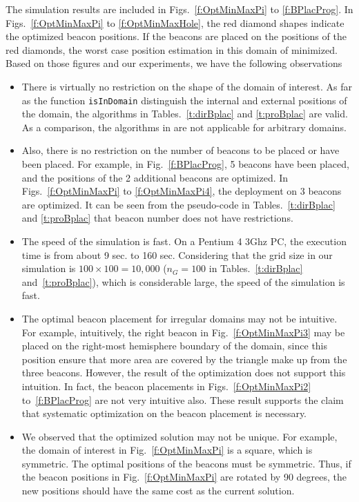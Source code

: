 The simulation results are included in Figs.~\ref{f:OptMinMaxPi} to \ref{f:BPlacProg}. In Figs.~\ref{f:OptMinMaxPi} to \ref{f:OptMinMaxHole}, the red diamond shapes indicate the optimized beacon positions. If the beacons are placed on the positions of the red diamonds, the worst case position estimation in this domain of minimized. Based on those figures and our experiments, we have the following observations
\begin{itemize}
\item There is virtually no restriction on the shape of the domain of interest. As far as the function \texttt{isInDomain} distinguish the internal and external positions of the domain, the algorithms in Tables.~\ref{t:dirBplac} and \ref{t:proBplac} are valid. As a comparison, the algorithms in \cite{bulusu01adaptive, WangEstrinInfomationSS05} are not applicable for arbitrary domains.
\item Also, there is no restriction on the number of beacons to be placed or have been placed. For example, in Fig.~\ref{f:BPlacProg}, 5 beacons have been placed, and the positions of the 2 additional beacons are optimized. In Figs.~\ref{f:OptMinMaxPi} to \ref{f:OptMinMaxPi4}, the deployment on 3 beacons are optimized. It can be seen from the pseudo-code in Tables.~\ref{t:dirBplac} and \ref{t:proBplac} that beacon number does not have restrictions.
\item The speed of the simulation is fast. On a Pentium 4 3Ghz PC, the execution time is from about 9 sec. to 160 sec. Considering that the grid size in our simulation is $100\times 100=10,000$ ($n_G=100$ in Tables.~\ref{t:dirBplac} and~\ref{t:proBplac}), which is considerable large, the speed of the simulation is fast.
\item The optimal beacon placement for irregular domains may not be intuitive. For example, intuitively, the right beacon in Fig.~\ref{f:OptMinMaxPi3} may be placed on the right-most hemisphere boundary of the domain, since this position ensure that more area are covered by the triangle make up from the three beacons.
    However, the result of the optimization does not support this intuition. In fact, the beacon placements in Figs.~\ref{f:OptMinMaxPi2} to~\ref{f:BPlacProg} are not very intuitive also. These result supports the claim that systematic optimization on the beacon placement is necessary.
\item We observed that the optimized solution may not be unique. For example, the domain of interest in Fig.~\ref{f:OptMinMaxPi} is a square, which is symmetric. The optimal positions of the beacons must be symmetric. Thus, if the beacon positions in Fig.~\ref{f:OptMinMaxPi} are rotated by 90 degrees, the new positions should have the same cost as the current solution.

\end{itemize}
